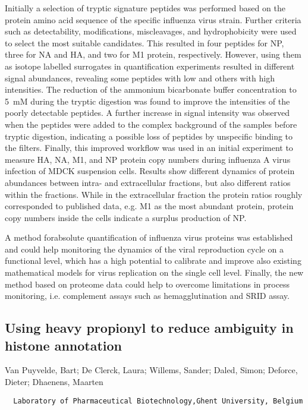 {Initially a selection of tryptic signature peptides was performed based on the protein amino acid sequence of the specific influenza virus strain. Further criteria such as detectability, modifications, miscleavages, and hydrophobicity were used to select the most suitable candidates. This resulted in four peptides for NP, three for NA and HA, and two for M1 protein, respectively. However, using them as isotope labelled surrogates in quantification experiments resulted in different signal abundances, revealing some peptides with low and others with high intensities. The reduction of the ammonium bicarbonate buffer concentration to 5 mM during the tryptic digestion was found to improve the intensities of the poorly detectable peptides. A further increase in signal intensity was observed when the peptides were added to the complex background of the samples before tryptic digestion, indicating a possible loss of peptides by unspecific binding to the filters. Finally, this improved workflow was used in an initial experiment to measure HA, NA, M1, and NP protein copy numbers during influenza A virus infection of MDCK suspension cells. Results show different dynamics of protein abundances between intra- and extracellular fractions, but also different ratios within the fractions. While in the extracellular fraction the protein ratios roughly corresponded to published data, e.g. M1 as the most abundant protein, protein copy numbers inside the cells indicate a surplus production of NP.

A method forabsolute quantification of influenza virus proteins was established and could help monitoring the dynamics of the viral reproduction cycle on a functional level, which has a high potential to calibrate and improve also existing mathematical models for virus replication on the single cell level. Finally, the new method based on proteome data could help to overcome limitations in process monitoring, i.e. complement assays such as hemagglutination and SRID assay.


\subsection*{\color{eubicRed} Using heavy propionyl to reduce ambiguity in histone annotation}
{\color{eubicGray}Van Puyvelde, Bart;
De Clerck, Laura;
Willems, Sander;
Daled, Simon;
Deforce, Dieter;
Dhaenens, Maarten}
{\color{eubicGray}\begin{verbatim}
  Laboratory of Pharmaceutical Biotechnology,Ghent University, Belgium
\end{verbatim}}

}
